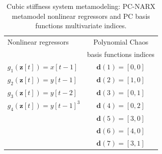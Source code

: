 \documentclass[preprint,3p,review,times,11pt]{elsarticle}
\newcommand{\bld}[1]{\boldsymbol{#1}}
\begin{document}
\begin{table} 
\centering
\caption{Cubic stiffness system metamodeling: PC-NARX metamodel nonlinear regressors and PC basis functions multivariate indices.}\label{tab:PCNARXcubic}
\small \begin{tabular}{lc}\hline 
Nonlinear regressors & Polynomial Chaos \\
 & basis functions indices \\\hline
$g_1({\bld z}[t]) = x[t-1]$   	& ${\bld d}{(1)} = [0, 0]$ \\
$g_2({\bld z}[t]) = y[t-1]$   	& ${\bld d}{(2)} = [1, 0]$ \\
$g_3({\bld z}[t]) = y[t-2]$   	& ${\bld d}{(3)} = [0, 1]$ \\
$g_4({\bld z}[t]) = y[t-1]^3$ 	& ${\bld d}{(4)} = [0, 2]$ \\
 								& ${\bld d}{(5)} = [3, 0]$ \\
								& ${\bld d}{(6)} = [4, 0]$ \\
								& ${\bld d}{(7)} = [3, 1]$ \\ \hline
\end{tabular}
\end{table}
\end{document}
